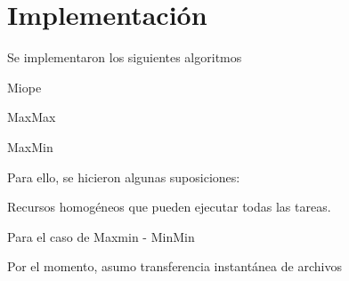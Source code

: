 \chapter{Implementación}

Se implementaron los siguientes algoritmos

Miope

MaxMax

MaxMin

Para ello, se hicieron algunas suposiciones:

Recursos homogéneos que pueden ejecutar todas las tareas.

Para el caso de Maxmin - MinMin

Por el momento, asumo transferencia instantánea de archivos
